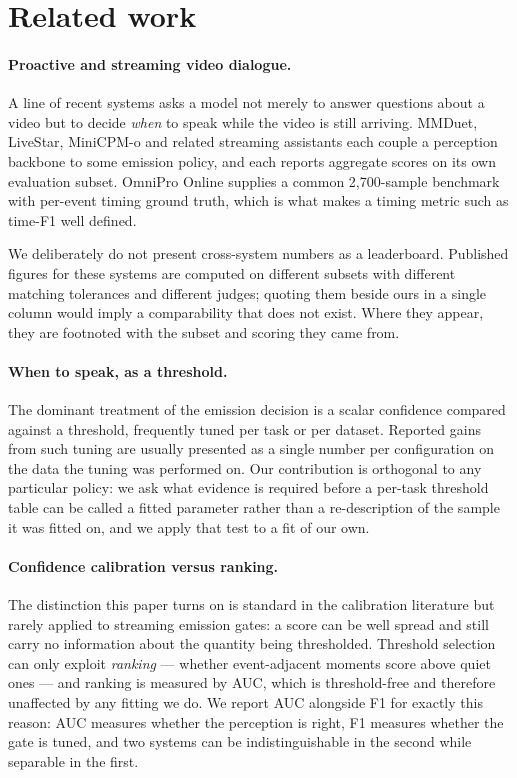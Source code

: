 \section{Related work}
\label{sec:related}

\paragraph{Proactive and streaming video dialogue.} A line of recent systems asks a
model not merely to answer questions about a video but to decide \emph{when} to
speak while the video is still arriving. MMDuet, LiveStar, MiniCPM-o and related
streaming assistants each couple a perception backbone to some emission policy,
and each reports aggregate scores on its own evaluation subset. OmniPro Online
supplies a common 2{,}700-sample benchmark with per-event timing ground truth,
which is what makes a timing metric such as time-F1 well defined.

We deliberately do not present cross-system numbers as a leaderboard. Published
figures for these systems are computed on different subsets with different
matching tolerances and different judges; quoting them beside ours in a single
column would imply a comparability that does not exist. Where they appear, they
are footnoted with the subset and scoring they came from.

\paragraph{When to speak, as a threshold.} The dominant treatment of the emission
decision is a scalar confidence compared against a threshold, frequently tuned per
task or per dataset. Reported gains from such tuning are usually presented as a
single number per configuration on the data the tuning was performed on. Our
contribution is orthogonal to any particular policy: we ask what evidence is
required before a per-task threshold table can be called a fitted parameter rather
than a re-description of the sample it was fitted on, and we apply that test to a
fit of our own.

\paragraph{Confidence calibration versus ranking.} The distinction this paper turns
on is standard in the calibration literature but rarely applied to streaming
emission gates: a score can be well spread and still carry no information about
the quantity being thresholded. Threshold selection can only exploit \emph{ranking}
--- whether event-adjacent moments score above quiet ones --- and ranking is
measured by AUC, which is threshold-free and therefore unaffected by any fitting we
do. We report AUC alongside F1 for exactly this reason: AUC measures whether the
perception is right, F1 measures whether the gate is tuned, and two systems can be
indistinguishable in the second while separable in the first.
